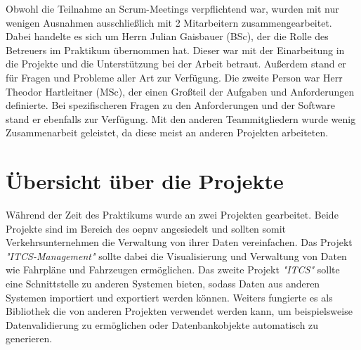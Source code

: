     Obwohl die Teilnahme an Scrum-Meetings verpflichtend war, wurden mit nur wenigen Ausnahmen ausschließlich mit 2 Mitarbeitern zusammengearbeitet. Dabei handelte es sich um Herrn Julian Gaisbauer 
    (BSc), der die Rolle des Betreuers im Praktikum übernommen hat. Dieser war mit der Einarbeitung in die Projekte und die Unterstützung bei der Arbeit betraut. Außerdem stand er für 
    Fragen und Probleme aller Art zur Verfügung. Die zweite Person war Herr Theodor Hartleitner (MSc), der einen Großteil der Aufgaben und Anforderungen definierte. Bei spezifischeren 
    Fragen zu den Anforderungen und der Software stand er ebenfalls zur Verfügung. Mit den anderen Teammitgliedern wurde wenig Zusammenarbeit geleistet, da diese meist an anderen Projekten arbeiteten.


\section{Übersicht über die Projekte}\label{sec:ueberblick-projekte}
    Während der Zeit des Praktikums wurde an zwei Projekten gearbeitet. Beide Projekte sind im Bereich des \gls{oepnv} angesiedelt und sollten somit Verkehrsunternehmen die Verwaltung von ihrer Daten 
    vereinfachen. Das Projekt \emph{"ITCS-Management"} sollte dabei die Visualisierung und Verwaltung von Daten wie Fahrpläne und Fahrzeugen ermöglichen. Das zweite Projekt 
    \emph{"ITCS"} sollte eine Schnittstelle zu anderen Systemen bieten, sodass Daten aus anderen Systemen importiert und exportiert werden können. Weiters fungierte es als Bibliothek 
    die von anderen Projekten verwendet werden kann, um beispielsweise Datenvalidierung zu ermöglichen oder Datenbankobjekte automatisch zu generieren.

